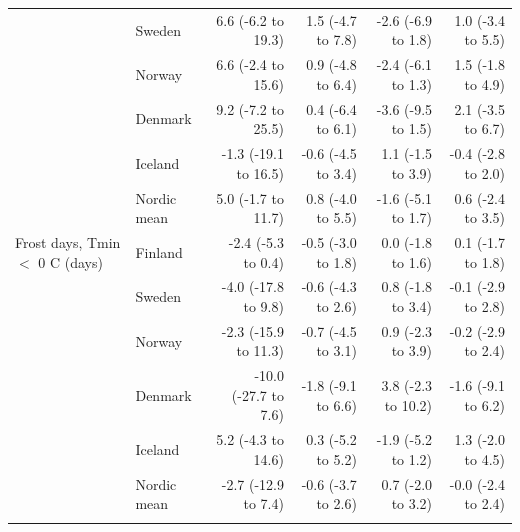 \begin{tabular}{llrrrr}
 & Sweden & 6.6 (-6.2 to 19.3) & 1.5 (-4.7 to 7.8) & -2.6 (-6.9 to 1.8) & 1.0 (-3.4 to 5.5) \\
 & Norway & 6.6 (-2.4 to 15.6) & 0.9 (-4.8 to 6.4) & -2.4 (-6.1 to 1.3) & 1.5 (-1.8 to 4.9) \\
 & Denmark & 9.2 (-7.2 to 25.5) & 0.4 (-6.4 to 6.1) & -3.6 (-9.5 to 1.5) & 2.1 (-3.5 to 6.7) \\
 & Iceland & -1.3 (-19.1 to 16.5) & -0.6 (-4.5 to 3.4) & 1.1 (-1.5 to 3.9) & -0.4 (-2.8 to 2.0) \\
 & Nordic mean & 5.0 (-1.7 to 11.7) & 0.8 (-4.0 to 5.5) & -1.6 (-5.1 to 1.7) & 0.6 (-2.4 to 3.5) \\
\addlinespace
Frost days, Tmin $<$ 0 \textdegree{}C (days) & Finland & -2.4 (-5.3 to 0.4) & -0.5 (-3.0 to 1.8) & 0.0 (-1.8 to 1.6) & 0.1 (-1.7 to 1.8) \\
 & Sweden & -4.0 (-17.8 to 9.8) & -0.6 (-4.3 to 2.6) & 0.8 (-1.8 to 3.4) & -0.1 (-2.9 to 2.8) \\
 & Norway & -2.3 (-15.9 to 11.3) & -0.7 (-4.5 to 3.1) & 0.9 (-2.3 to 3.9) & -0.2 (-2.9 to 2.4) \\
 & Denmark & -10.0 (-27.7 to 7.6) & -1.8 (-9.1 to 6.6) & 3.8 (-2.3 to 10.2) & -1.6 (-9.1 to 6.2) \\
 & Iceland & 5.2 (-4.3 to 14.6) & 0.3 (-5.2 to 5.2) & -1.9 (-5.2 to 1.2) & 1.3 (-2.0 to 4.5) \\
 & Nordic mean & -2.7 (-12.9 to 7.4) & -0.6 (-3.7 to 2.6) & 0.7 (-2.0 to 3.2) & -0.0 (-2.4 to 2.4) \\
\addlinespace
\bottomrule
\end{tabular}